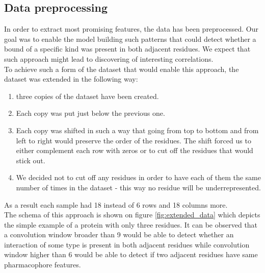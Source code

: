 \documentclass[a4paper,10pt]{report}
\begin{document}


	\subsection{Data preprocessing}\label{sec:data_processing}
	  In order to extract most promising features, the data has been preprocessed. Our goal was to enable the model building such patterns that could detect whether a bound of a specific kind was present in both adjacent residues. We expect that such approach might lead to discovering of interesting correlations.\\
	  
	  To achieve such a form of the dataset that would enable this approach, the dataset was extended in the following way:
	  \begin{enumerate}
	   \item three copies of the dataset have been created.
	   \item Each copy was put just below the previous one. 
	   \item Each copy was shifted in such a way that going from top to bottom and from left to right would preserve the order of the residues. The shift forced us to either complement each row with zeros or to cut off the residues that would stick out.
	   \item We decided not to cut off any residues in order to have each of them the same number of times in the dataset - this way no residue will be underrepresented.
	  \end{enumerate}

	  As a result each sample had 18 instead of 6 rows and 18 columns more.\\
	  
	  The schema of this approach is shown on figure \ref{fig:extended_data} which depicts the simple example of a protein with only three residues. It can be observed that a convolution window broader than 9 would be able to detect whether an interaction of some type is present in both adjacent residues while convolution window higher than 6 would be able to detect if two adjacent residues have same pharmacophore features.\\
	  
\end{document}
